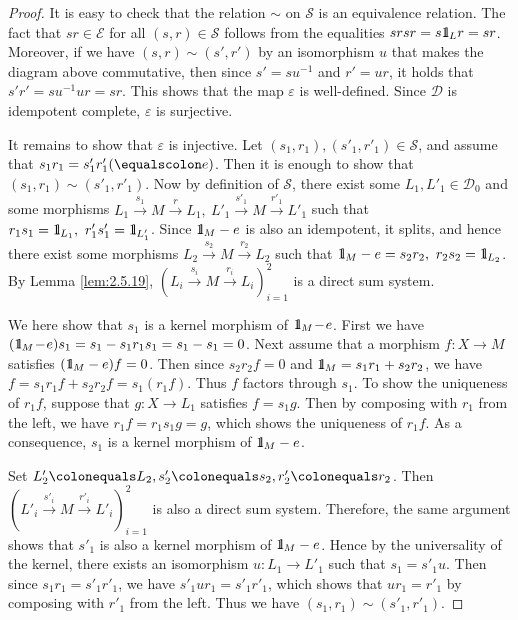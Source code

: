 \documentclass{surv-l}
\numberwithin{equation}{chapter}
\numberwithin{figure}{chapter}
\theoremstyle{plain}
\theoremstyle{definition}
\theoremstyle{remark}
\newcommand{\id}{1\kern-.25em{\text{{\rm l}}}}
\begin{document}
\begin{proof}
It is easy to check that the relation $\sim$ on $\mathcal{S}$ is an equivalence relation.
The fact that $sr \in \mathcal{E}$ for all $(s,r) \in \mathcal{S}$
follows from the equalities $srsr = s\id_L r = sr$.
Moreover, if we have $(s,r) \sim (s',r')$ by an isomorphism $u$ that makes
the diagram above commutative, then
since $s' = su^{-1}$ and $r' = ur$, it holds that $s'r' = su^{-1} ur = sr$.
This shows that the map $\varepsilon$ is well-defined.
Since ${\mathcal{D}}$ is idempotent complete, $\varepsilon$ is surjective.

It remains to show that $\varepsilon$ is injective.
Let $(s_1,r_1), (s'_1,r'_1) \in \mathcal{S}$, and assume that $s_1r_1 = s'_1r'_1 (\equalscolon e)$.
Then it is enough to show that $(s_1,r_1) \sim (s'_1, r'_1)$.
Now by definition of $\mathcal{S}$, there exist some $L_1, L'_1 \in {\mathcal{D}}_0$ and some
morphisms $L_1 \xrightarrow{s_1} M \xrightarrow{r} L_1, \ L'_1 \xrightarrow{s'_1} M \xrightarrow{r'_1} L'_1$ such that
$r_1s_1 = \id_{L_1},\ r'_1s'_1 = \id_{L'_1}$.
Since $\id_M - e$ is also an idempotent, it splits, and hence
there exist some morphisms
$L_2 \xrightarrow{s_2} M \xrightarrow{r_2} L_2$ such that
$\id_M - e = s_2r_2,\ r_2s_2 = \id_{L_2}$.
By Lemma \ref{lem:2.5.19},
$(L_i \xrightarrow{s_i} M \xrightarrow{r_i} L_i)_{i=1}^2$ is a direct sum system.

We here show that $s_1$ is a kernel morphism of $\id_M \!-\! e$.
First we have $(\id_M \!-\! e)s_1 = s_1 - s_1r_1s_1 = s_1 - s_1 = 0$.
Next assume that a morphism $f\colon X \to M$ satisfies $(\id_M - e)f = 0$.
Then since $s_2r_2f = 0$ and $\id_M = s_1r_1 + s_2r_2$, we have
$f = s_1r_1f + s_2r_2f = s_1(r_1f)$.
Thus $f$ factors through $s_1$.
To show the uniqueness of $r_1f$, suppose that
$g \colon X \to L_1$ satisfies $f = s_1 g$.
Then by composing with $r_1$ from the left,
we have $r_1f = r_1s_1g = g$, which shows the uniqueness of $r_1f$.
As a consequence, $s_1$ is a kernel morphism of $\id_M - e$.

Set $L'_2\colonequals  L_2, s'_2\colonequals  s_2, r'_2\colonequals  r_2$.
Then $(L'_i \xrightarrow{s'_i} M \xrightarrow{r'_i} L'_i)_{i=1}^2$ is also a direct sum system.
Therefore, the same argument shows that
$s'_1$ is also a kernel morphism of $\id_M - e$.
Hence by the universality of the kernel, there exists an isomorphism
$u\colon L_1 \to L'_1$ such that $s_1 = s'_1 u$.
Then since $s_1r_1 = s'_1r'_1$, we have $s'_1 u r_1 = s'_1r'_1$,
which shows that $ur_1 = r'_1$ by composing with $r'_1$ from the left.
Thus we have $(s_1, r_1) \sim (s'_1, r'_1)$.
\end{proof}
\end{document}
